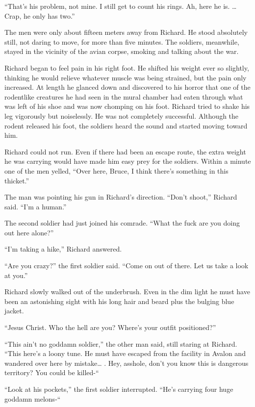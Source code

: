 \documentclass[]{article}
\begin{document}
{{“That’s his problem, not mine.  I still get to count his rings.  Ah, here he is.  … Crap, he only has two.”

The men were only about fifteen meters away from Richard.  He stood absolutely still, not daring to move, for more than five minutes.  The soldiers, meanwhile, stayed in the vicinity of the avian corpse, smoking and talking about the war.

Richard began to feel pain in his right foot.  He shifted his weight ever so slightly, thinking he would relieve whatever muscle was being strained, but the pain only increased.  At length he glanced down and discovered to his horror that one of the rodentlike creatures he had seen in the mural chamber had eaten through what was left of his shoe and was now chomping on his foot.  Richard tried to shake his leg vigorously but noiselessly.  He was not completely successful.  Although the rodent released his foot, the soldiers heard the sound and started moving toward him.

Richard could not run.  Even if there had been an escape route, the extra weight he was carrying would have made him easy prey for the soldiers.  Within a minute one of the men yelled, “Over here, Bruce, I think there’s something in this thicket.”

The man was pointing his gun in Richard’s direction.  “Don’t shoot,” Richard said.  “I’m a human.”

The second soldier had just joined his comrade.  “What the fuck are you doing out here alone?”

“I’m taking a hike,” Richard answered.

“Are you crazy?” the first soldier said.  “Come on out of there.  Let us take a look at you.”

Richard slowly walked out of the underbrush.  Even in the dim light he must have been an astonishing sight with his long hair and beard plus the bulging blue jacket.

“Jesus Christ.  Who the hell are you? Where’s your outfit positioned?”

“This ain’t no goddamn soldier,” the other man said, still staring at Richard.  “This here’s a loony tune.  He must have escaped from the facility in Avalon and wandered over here by mistake… .  Hey, asshole, don’t you know this is dangerous territory? You could be killed-“

“Look at his pockets,” the first soldier interrupted.  “He’s carrying four huge goddamn melons-“

}}
\end{document}

